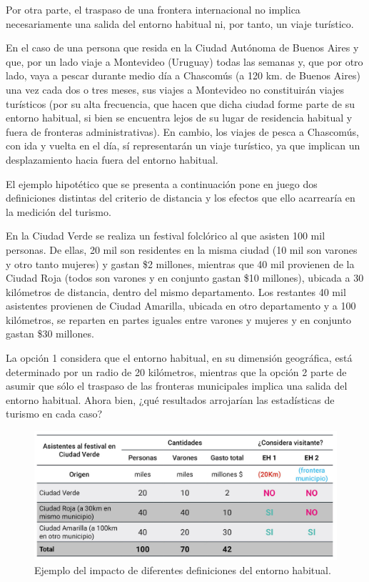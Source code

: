 \documentclass[
  openany]{book}
\begin{document}
Por otra parte, el traspaso de una frontera internacional no implica necesariamente una salida del entorno habitual ni, por tanto, un viaje turístico.

En el caso de una persona que resida en la Ciudad Autónoma de Buenos Aires y que, por un lado viaje a Montevideo (Uruguay) todas las semanas y, que por otro lado, vaya a pescar durante medio día a Chascomús (a 120 km. de Buenos Aires) una vez cada dos o tres meses, sus viajes a Montevideo no constituirán viajes turísticos (por su alta frecuencia, que hacen que dicha ciudad forme parte de su entorno habitual, si bien se encuentra lejos de su lugar de residencia habitual y fuera de fronteras administrativas). En cambio, los viajes de pesca a Chascomús, con ida y vuelta en el día, sí representarán un viaje turístico, ya que implican un desplazamiento hacia fuera del entorno habitual.

El ejemplo hipotético que se presenta a continuación pone en juego dos definiciones distintas del criterio de distancia y los efectos que ello acarrearía en la medición del turismo.

En la Ciudad Verde se realiza un festival folclórico al que asisten 100 mil personas. De ellas, 20 mil son residentes en la misma ciudad (10 mil son varones y otro tanto mujeres) y gastan \$2 millones, mientras que 40 mil provienen de la Ciudad Roja (todos son varones y en conjunto gastan \$10 millones), ubicada a 30 kilómetros de distancia, dentro del mismo departamento. Los restantes 40 mil asistentes provienen de Ciudad Amarilla, ubicada en otro departamento y a 100 kilómetros, se reparten en partes iguales entre varones y mujeres y en conjunto gastan \$30 millones.

La opción 1 considera que el entorno habitual, en su dimensión geográfica, está determinado por un radio de 20 kilómetros, mientras que la opción 2 parte de asumir que sólo el traspaso de las fronteras municipales implica una salida del entorno habitual. Ahora bien, ¿qué resultados arrojarían las estadísticas de turismo en cada caso?

\begin{figure}

{\centering \includegraphics[width=1\linewidth]{imagenes/figura1.2} 

}

\caption{Ejemplo del impacto de diferentes definiciones del entorno habitual.}\label{fig:entorno}
\end{figure}
\end{document}
